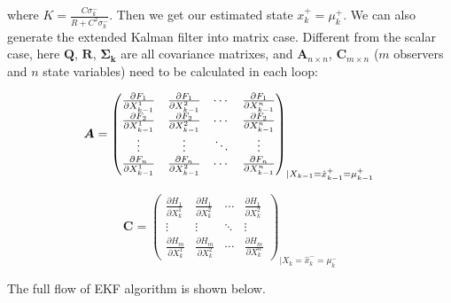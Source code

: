 \documentclass[conference]{IEEEtran}
\begin{document}
	where $K=\frac{C\sigma_{k}^{-}}{R+C^{2}\sigma_{k}^{-}}$. Then we get our estimated state $x_{k}^{+}=\mu_{k}^{+}$. We can also generate the extended Kalman filter into matrix case. Different from the scalar case, here $\boldsymbol{Q}$, $\boldsymbol{R}$, $\boldsymbol{\Sigma_{k}}$ are all covariance matrixes, and $\boldsymbol{A}_{n\times n}$, $\boldsymbol{C}_{m\times n}$ ($m$ observers and $n$ state variables) need to be calculated in each loop:
	
	\begin{equation}
	\boldsymbol{A}=\begin{pmatrix}
	\frac{\partial F_{1}}{\partial X_{k-1}^{1}} &\frac{\partial F_{1}}{\partial X_{k-1}^{2}}  &\cdots   &\frac{\partial F_{1}}{\partial X_{k-1}^{n}} \\ 
	\frac{\partial F_{2}}{\partial X_{k-1}^{1}} &\frac{\partial F_{2}}{\partial X_{k-1}^{2}}  &\cdots   &\frac{\partial F_{2}}{\partial X_{k-1}^{n}} \\ 
	\vdots  &\vdots   &\ddots   &\vdots  \\ 
	\frac{\partial F_{n}}{\partial X_{k-1}^{1}} &\frac{\partial F_{n}}{\partial X_{k-1}^{2}}  &\cdots   & \frac{\partial F_{n}}{\partial X_{k-1}^{n}}
	\end{pmatrix}_{\mid X_{k-1}=\hat{x}_{k-1}^{+}=\mu_{k-1}^{+}}\\
	\label{eq16}
	\end{equation}
	
	\begin{equation}
	\boldsymbol{C}=\begin{pmatrix}
	\frac{\partial H_{1}}{\partial X_{k}^{1}} &\frac{\partial H_{1}}{\partial X_{k}^{2}}  &\cdots   &\frac{\partial H_{1}}{\partial X_{k}^{2}} \\ 
	\vdots  &\vdots   &\ddots   &\vdots  \\ 
	\frac{\partial H_{m}}{\partial X_{k}^{1}} &\frac{\partial H_{m}}{\partial X_{k}^{2}}  &\cdots   &\frac{\partial H_{m}}{\partial X_{k}^{n}} 
	\end{pmatrix}_{\mid X_{k}=\hat{x}_{k}^{-}=\mu_{k}^{-}} 
	\label{eq17}
	\end{equation}
	
	
	
	The full flow of EKF algorithm is shown below.
	
\end{document}
